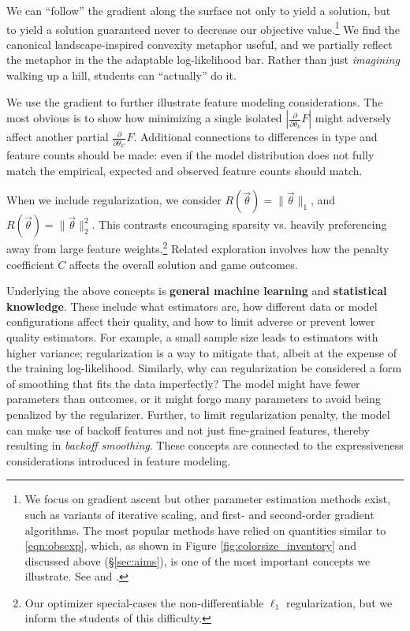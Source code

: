 \documentclass[11pt,letterpaper]{article}
\begin{document}
We can ``follow'' the gradient along the surface not only to yield a solution, but to yield a solution guaranteed 
never to decrease our objective value.\footnote{We focus on gradient ascent but other parameter estimation methods 
exist, such as variants of iterative scaling, and first- and second-order gradient algorithms. The most popular 
methods have relied on quantities similar to \eqref{eqn:obsexp}, which, as shown in Figure \ref{fig:colorsize_inventory} 
and discussed above (\S\ref{sec:aims}), is 
one of the most important concepts we illustrate. See 
 and . }
We find the canonical landscape-inspired convexity metaphor useful, and we partially reflect 
the metaphor in the the adaptable log-likelihood bar. Rather than just \textit{imagining} walking up a hill, 
students can ``actually'' do it.

We use the gradient to further illustrate feature modeling considerations. The most obvious is to show how 
minimizing a single isolated $|\frac{\partial}{\partial \theta_k} F|$ might adversely affect another partial 
$\frac{\partial}{\partial \theta_{k'}}F$. Additional connections to differences in type and feature counts should be 
made: even if the model distribution does not fully match the empirical, expected and observed feature 
counts should match.

When we include regularization, we consider $R(\vec{\theta}) = \|\vec\theta\|_1$, and 
$R(\vec{\theta}) = \|\vec{\theta}\|_2^2$. This contrasts encouraging sparsity vs.  
heavily preferencing away from large feature weights.\footnote{Our optimizer special-cases 
the non-differentiable $\ell_1$ regularization, but we inform the students of this difficulty.} 
Related exploration involves how the penalty coefficient $C$ affects the overall solution and game outcomes.

Underlying the above concepts is \textbf{general machine learning} and 
\textbf{statistical knowledge}. These include what estimators are,  how different data or model configurations 
affect their quality, and how to limit adverse or prevent lower quality estimators. For example, 
a small sample size leads to estimators with higher variance; regularization is a way to mitigate that, albeit at the expense of 
the training log-likelihood. 
Similarly, why can regularization be considered a form of smoothing that fits the data 
imperfectly? The model might have fewer parameters than 
outcomes, or it might forgo many parameters to avoid being penalized by 
the regularizer.  Further, to limit regularization penalty, the model can make 
use of backoff features and not just fine-grained features, thereby resulting 
in \textit{backoff smoothing}. These concepts are connected to the expressiveness 
considerations introduced in feature modeling.
\end{document}
